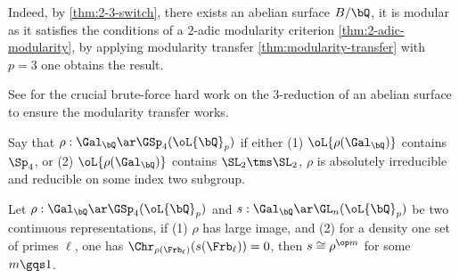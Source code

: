 \documentclass[article, a4paper, twoside]{universal}
\begin{document}
\begin{prf}
    Indeed, by \cref{thm:2-3-switch}, there exists an abelian surface $B/\bQ$, it is modular as it satisfies the conditions of a $2$-adic modularity criterion \cref{thm:2-adic-modularity}, by applying modularity transfer \cref{thm:modularity-transfer} with $p=3$ one obtains the result.
\end{prf}

\begin{rmk}
    See \cite[6.4.3]{BCGP2025} for the crucial brute-force hard work on the $3$-reduction of an abelian surface to ensure the modularity transfer works.
\end{rmk}

\begin{cmt}    
\begin{dfn}
    Say that $\rho:\Gal_{\bQ}\ar\GSp_{4}(\oL{\bQ}_{p})$  if either (1) $\oL{\rho(\Gal_{\bQ})}$ contains $\Sp_{4}$, or (2) $\oL{\rho(\Gal_{\bQ})}$ contains $\SL_{2}\tms\SL_{2}$, $\rho$ is absolutely irreducible and reducible on some index two subgroup.
\end{dfn}

\begin{thm}
    Let $\rho:\Gal_{\bQ}\ar\GSp_{4}(\oL{\bQ}_{p})$ and $s:\Gal_{\bQ}\ar\GL_{n}(\oL{\bQ}_{p})$ be two continuous representations, if (1) $\rho$ has large image, and (2) for a density one set of primes $\ell$, one has $\Chr_{\rho(\Frb_{\ell})}(s(\Frb_{\ell}))=0$, then $s\cong\rho^{\op m}$ for some $m\gqs1$.
\end{thm}
\end{cmt}
\end{document}
